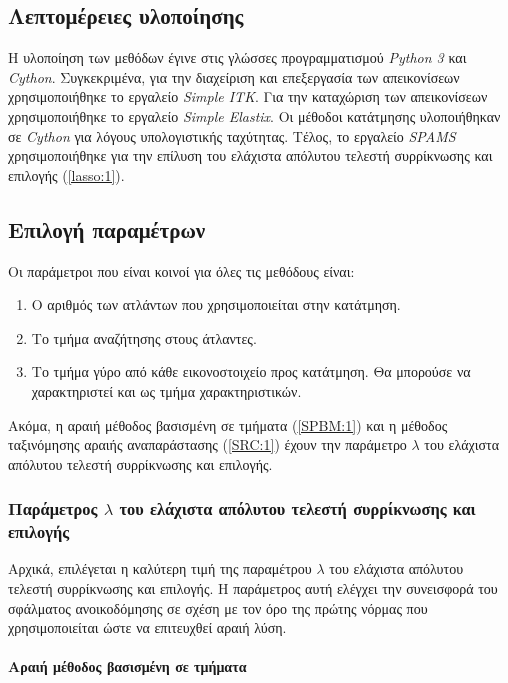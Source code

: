 \documentclass[a4paper,12pt]{article}
\newcommand{\paragraphLine}[1]{\paragraph{#1}\mbox{}}
\begin{document}
\subsection{Λεπτομέρειες υλοποίησης}

Η υλοποίηση των μεθόδων έγινε στις γλώσσες προγραμματισμού \emph{Python 3} και
\emph{Cython}. Συγκεκριμένα, για την διαχείριση και επεξεργασία των
απεικονίσεων χρησιμοποιήθηκε το εργαλείο \emph{Simple ITK}. Για την καταχώριση
των απεικονίσεων χρησιμοποιήθηκε το εργαλείο \emph{Simple Elastix}. Οι μέθοδοι
κατάτμησης υλοποιήθηκαν σε \emph{Cython} για λόγους υπολογιστικής ταχύτητας.
Τέλος, το εργαλείο \emph{SPAMS} χρησιμοποιήθηκε για την επίλυση του ελάχιστα
απόλυτου τελεστή συρρίκνωσης και επιλογής (\ref{lasso:1}).

\subsection{Επιλογή παραμέτρων}

Οι παράμετροι που είναι κοινοί για όλες τις μεθόδους είναι:

\begin{enumerate}
    \item Ο αριθμός των ατλάντων που χρησιμοποιείται στην κατάτμηση.
    \item Το τμήμα αναζήτησης στους άτλαντες.
    \item Το τμήμα γύρο από κάθε εικονοστοιχείο προς κατάτμηση. Θα μπορούσε να
          χαρακτηριστεί και ως τμήμα χαρακτηριστικών.
\end{enumerate}

Ακόμα, η αραιή μέθοδος βασισμένη σε τμήματα (\ref{SPBM:1}) και η μέθοδος
ταξινόμησης αραιής αναπαράστασης (\ref{SRC:1}) έχουν την παράμετρο $\lambda$ του
ελάχιστα απόλυτου τελεστή συρρίκνωσης και επιλογής.

\subsubsection{Παράμετρος $\lambda$ του ελάχιστα απόλυτου τελεστή συρρίκνωσης
και επιλογής}

Αρχικά, επιλέγεται η καλύτερη τιμή της παραμέτρου $\lambda$ του ελάχιστα
απόλυτου τελεστή συρρίκνωσης και επιλογής. Η παράμετρος αυτή ελέγχει την
συνεισφορά του σφάλματος ανοικοδόμησης σε σχέση με τον όρο της πρώτης νόρμας που
χρησιμοποιείται ώστε να επιτευχθεί αραιή λύση.

\paragraphLine{Αραιή μέθοδος βασισμένη σε τμήματα}
\end{document}
